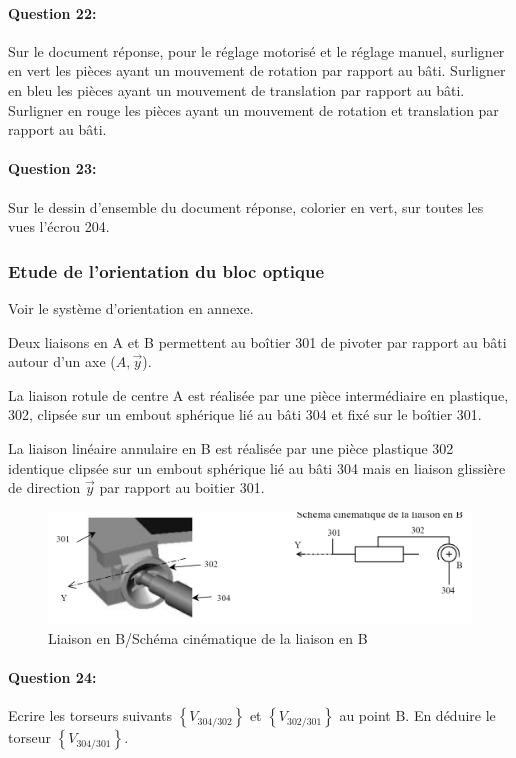 \paragraph{Question 22:} Sur le document réponse, pour le réglage motorisé et le réglage manuel, surligner en vert les pièces ayant un mouvement de rotation par rapport au bâti. Surligner en bleu les pièces ayant un mouvement de translation par rapport au bâti. Surligner en rouge les pièces ayant un mouvement de rotation et translation par rapport au bâti.

\paragraph{Question 23:} Sur le dessin d'ensemble du document réponse, colorier en vert, sur toutes les vues l'écrou 204.

\subsubsection{Etude de l'orientation du bloc optique}

Voir le système d'orientation en annexe.

Deux liaisons en A et B permettent au boîtier 301 de pivoter par rapport au bâti autour d'un axe ($A,\overrightarrow{y}$).

La liaison rotule de centre A est réalisée par une pièce intermédiaire en plastique, 302, clipsée sur un embout sphérique lié au bâti 304 et fixé sur le boîtier 301.

La liaison linéaire annulaire en B est réalisée par une pièce plastique 302 identique clipsée sur un embout sphérique lié au bâti 304 mais en liaison glissière de direction $\overrightarrow{y}$ par rapport au boitier 301.

\begin{figure}[!h]
  \centering
  \includegraphics[width=0.6\linewidth]{img/phare11}
  \caption{Liaison en B/Schéma cinématique de la liaison en B}
  \label{phare11}
\end{figure}

\paragraph{Question 24:} Ecrire les torseurs suivants $\left\{V_{304/302}\right\}$ et $\left\{V_{302/301}\right\}$ au point B. En déduire le torseur $\left\{V_{304/301}\right\}$.

